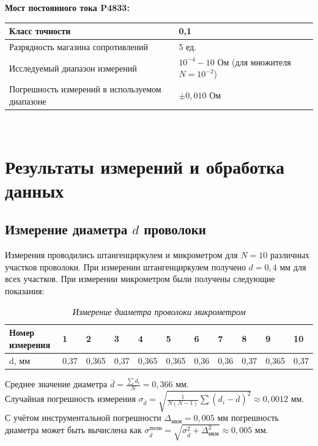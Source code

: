 \documentclass[a4paper,12pt]{article} %
\begin{document}
\noindent\textbf{Мост постоянного тока P4833:}\\
\begin{tabular}{|p{8cm}|p{7cm}|}
	\hline
	Класс точности&0,1 \\
	\hline
	Разрядность магазина сопротивлений& 5 ед. \\
	\hline
	Исследуемый диапазон измерений& $ 10^{-4} - 10 \text{ Ом} $ (для множителя $ N = 10^{-2} $) \\
	\hline
	Погрешность измерений в используемом диапазоне& $\pm0,010\text{ Ом}$ \\
	\hline
\end{tabular}\\

\section{Результаты измерений и обработка данных}

\subsection{Измерение диаметра $d$ проволоки}

Измерения проводились штангенциркулем и микрометром для $N = 10$ различных участков проволоки. При измерении штангенциркулем получено $d = 0,4$ мм для всех участков. При измерении микрометром были получены следующие показания:

\begin{table}[h]
	\begin{tabular}{|l|l|l|l|l|l|l|l|l|l|l|}
		\hline
		Номер   измерения & 1    & 2    & 3    & 4    & 5    & 6    & 7    & 8    & 9    & 10   \\ \hline
		d, мм             & 0,37 & 0,365 & 0,37 & 0,365 & 0,365 & 0,36 & 0,36 & 0,37 & 0,365 & 0,37 \\ \hline
	\end{tabular}\caption{\textit{Измерение диаметра проволоки микрометром}}
\end{table}

Среднее значение диаметра $ \overline{d} = \frac{\sum d_i}{N} = 0,366 \text{ мм}$.\\

Случайная погрешность измерения $ \sigma_{\overline{d}} = \sqrt{\frac{1}{N  (N-1)}\sum(d_i-\overline{d})^2} \approx 0,0012 \text{ мм}$.\\

С учётом инструментальной погрешности $ \Delta_\text{мкм} = 0,005$ мм погрешность диаметра может быть вычислена как $ \sigma^{\text{полн}}_{\overline{d}} = \sqrt{\sigma^2_{\overline{d}} + \Delta^2_{\text{мкм}}} \approx 0,005 \text{ мм}$. \\
\end{document}
